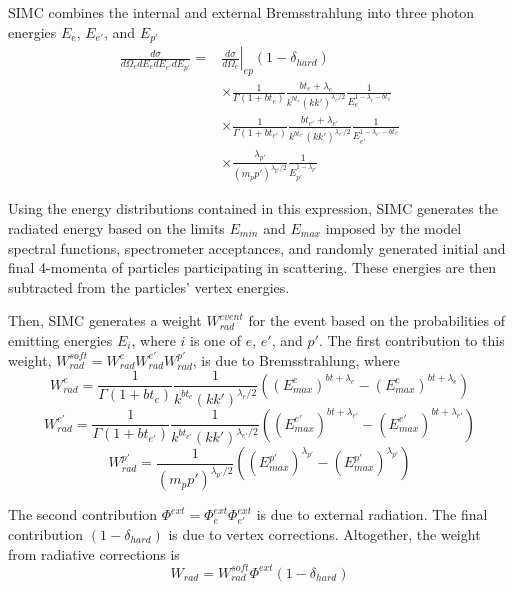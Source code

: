 SIMC combines the internal and external Bremsstrahlung into three
photon energies $E_e$, $E_{e'}$, and $E_{p'}$
\begin{align}
\frac{d\sigma}{d\Omega_{e} dE_{e} dE_{e'} dE_{p'}} =&\left.\frac{d\sigma}{d\Omega_{e}}\right|_{ep} \left(1-\delta_{hard}\right) \\
    &\times \frac{1}{\Gamma\left(1+b t_{e}\right)}  \frac{bt_{e}  + \lambda_{e}} {k^{bt_{e}} (kk')^{\lambda_{e}/2}}  \frac{1}{E_{e}^{1 -\lambda_{e} -bt_{e}}} \\
    &\times \frac{1}{\Gamma\left(1+b t_{e'}\right)} \frac{bt_{e'} + \lambda_{e'}}{k^{bt_{e'}}(kk')^{\lambda_{e'}/2}} \frac{1}{E_{e'}^{1-\lambda_{e'}-bt_{e'}}} \\
    &\times \frac{\lambda_{p'}}{(m_p p')^{\lambda_{p'}/2}} \frac{1}{E_{p'}^{1-\lambda_{p'}}}
\end{align}

Using the energy distributions contained in this expression,
SIMC generates the radiated energy based on the limits
$E_{min}$ and $E_{max}$
imposed by
the model spectral functions,
spectrometer acceptances,
and randomly generated initial and final 4-momenta of particles participating
in scattering.
These energies are then subtracted from the particles' vertex energies.


Then, SIMC generates a weight $W^{event}_{rad}$ for the event based on the
probabilities of emitting energies $E_i$, where $i$ is one of $e$, $e'$, and
$p'$.
The first contribution to this weight,
$W^{soft}_{rad}=W^{e}_{rad}W^{e'}_{rad}W^{p'}_{rad}$, is due to Bremsstrahlung,
where
\begin{equation}
    W^{e}_{rad} = \frac{1}{\Gamma(1+bt_{e})} \frac{1}{k^{bt_{e}}(kk')^{\lambda_{e}/2}}
                \left((E^{e}_{max})^{bt+\lambda_{e}}-(E^{e}_{max})^{bt+\lambda_{e}}\right)
\end{equation}
\begin{equation}
    W^{e'}_{rad} = \frac{1}{\Gamma(1+bt_{e'})} \frac{1}{k^{bt_{e'}}(kk')^{\lambda_{e'}/2}}
                \left((E^{e'}_{max})^{bt+\lambda_{e'}}-(E^{e'}_{max})^{bt+\lambda_{e'}}\right)
\end{equation}
\begin{equation}
    W^{p'}_{rad} =  \frac{1}{(m_p p')^{\lambda_{p'}/2}}
                \left((E^{p'}_{max})^{\lambda_{p'}}-(E^{p'}_{max})^{\lambda_{p'}}\right)
\end{equation}

The second contribution $\Phi^{ext}=\Phi^{ext}_{e}\Phi^{ext}_{e'}$
is due to external radiation.
The final contribution $(1-\delta_{hard})$ is due to vertex corrections.
Altogether, the weight from radiative corrections is
\begin{equation}
    W_{rad} = W^{soft}_{rad} \Phi^{ext} (1-\delta_{hard})
\end{equation}


